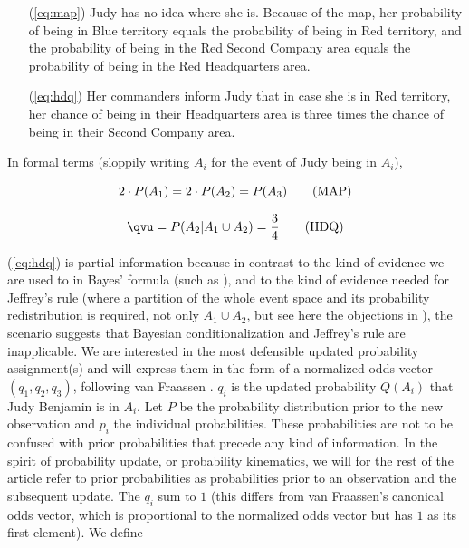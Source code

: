\documentclass[phd,12pt,oneside]{ubcthesis}
\begin{document}
\begin{enumerate}
\item[({\ref{eq:map}})] Judy has no idea where she is. Because of the
  map, her probability of being in Blue territory equals the
  probability of being in Red territory, and the probability of being
  in the Red Second Company area equals the probability of being in
  the Red Headquarters area.
\item[({\ref{eq:hdq}})] Her commanders inform Judy that in case she is in Red
  territory, her chance of being in their Headquarters area is three
  times the chance of being in their Second Company area.
\end{enumerate}

\nial In formal terms (sloppily writing $A_{i}$ for the event of Judy
being in $A_{i}$),

\begin{equation}
  \label{eq:map}
  2\cdot{}P(A_{1})=2\cdot{}P(A_{2})=P(A_{3})\tag{\mbox{MAP}}
\end{equation}

\begin{equation}
  \label{eq:hdq}
  {\qvu}=P(A_{2}|A_{1}\cup{}A_{2})=\frac{3}{4}\tag{\mbox{HDQ}}
\end{equation}

\nial ({\ref{eq:hdq}}) is partial information because in contrast to
the kind of evidence we are used to in Bayes' formula (such as
), and to the kind of evidence needed
for Jeffrey's rule (where a partition of the whole event space and its
probability redistribution is required, not only $A_{1}\cup{}A_{2}$,
but see here the objections in ), the
scenario suggests that Bayesian conditionalization and Jeffrey's rule
are inapplicable. We are interested in the most defensible updated
probability assignment(s) and will express them in the form of a
normalized odds vector $(q_{1},q_{2},q_{3})$, following van Fraassen
. $q_{i}$ is the updated probability $Q(A_{i})$
that Judy Benjamin is in $A_{i}$. Let $P$ be the probability
distribution prior to the new observation and $p_{i}$ the individual
 probabilities. These probabilities are not to be
confused with prior probabilities that precede any kind of
information. In the spirit of probability update, or probability
kinematics, we will for the rest of the article refer to prior
probabilities as probabilities prior to an observation and the
subsequent update. The $q_{i}$ sum to $1$ (this differs from van
Fraassen's canonical odds vector, which is proportional to the
normalized odds vector but has $1$ as its first element). We define
\end{document}
